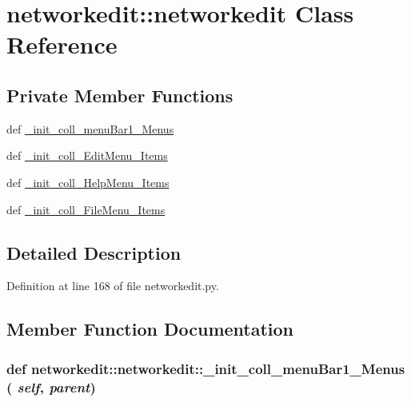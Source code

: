 \hypertarget{classnetworkedit_1_1networkedit}{
\section{networkedit::networkedit Class Reference}
\label{classnetworkedit_1_1networkedit}
}
\subsection*{Private Member Functions}
\begin{CompactItemize}
\item 
def \hyperlink{classnetworkedit_1_1networkedit_d77fb9e0e648f4c8293fb0477cd2a21b}{\_\-init\_\-coll\_\-menu\-Bar1\_\-Menus}
\item 
def \hyperlink{classnetworkedit_1_1networkedit_25c016ab06d767eba51087786081afdc}{\_\-init\_\-coll\_\-Edit\-Menu\_\-Items}
\item 
def \hyperlink{classnetworkedit_1_1networkedit_eff9fade803f4b7a384ee62c83d70390}{\_\-init\_\-coll\_\-Help\-Menu\_\-Items}
\item 
def \hyperlink{classnetworkedit_1_1networkedit_819560a4debaf28d7a1837c1fe68212b}{\_\-init\_\-coll\_\-File\-Menu\_\-Items}
\end{CompactItemize}


\subsection{Detailed Description}




Definition at line 168 of file networkedit.py.

\subsection{Member Function Documentation}
\hypertarget{classnetworkedit_1_1networkedit_d77fb9e0e648f4c8293fb0477cd2a21b}{
\subsubsection[\_\-init\_\-coll\_\-menuBar1\_\-Menus]{\setlength{\rightskip}{0pt plus 5cm}def networkedit::networkedit::\_\-init\_\-coll\_\-menu\-Bar1\_\-Menus ( {\em self},  {\em parent})}}
\label{classnetworkedit_1_1networkedit_d77fb9e0e648f4c8293fb0477cd2a21b}




